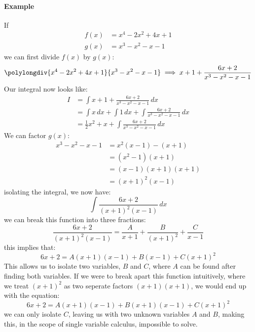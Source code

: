 \documentclass[12pt]{article}
\begin{document}
\paragraph{Example} If 
\begin{align*}
    f(x) &= x^4-2x^2+4x+1 \\
    g(x) &= x^3-x^2-x-1
\end{align*}
we can first divide $f(x)$ by $g(x)$:
\begin{equation*}
    \polylongdiv{x^4-2x^2+4x+1}{x^3-x^2-x-1}
    \implies x+1+\frac{6x+2}{x^3-x^2-x-1}
\end{equation*}
Our integral now looks like:
\begin{align*}
    I &= \int x+1+\frac{6x+2}{x^3-x^2-x-1} \,dx \\
      &= \int x \,dx + \int 1 \,dx + \int \frac{6x+2}{x^3-x^2-x-1} \,dx \\
      &= \frac{1}{2}x^2 + x + \int \frac{6x+2}{x^3-x^2-x-1} \,dx
\end{align*}
We can factor $g(x)$:
\begin{align*}
    x^3-x^2-x-1 &= x^2(x-1)-(x+1) \\
                &= (x^2-1)(x+1) \\
                &= (x-1)(x+1)(x+1) \\
                &= (x+1)^2(x-1)
\end{align*}
isolating the integral, we now have:
\[ \int \frac{6x+2}{(x+1)^2(x-1)} \,dx \]
we can break this function into three fractions:
\[ \frac{6x+2}{(x+1)^2(x-1)} = \frac{A}{x+1} + \frac{B}{(x+1)^2} + \frac{C}{x-1} \]
this implies that:
\[ 6x+2 = A(x+1)(x-1) + B(x-1) + C(x+1)^2 \]
This allows us to isolate two variables, $B$ and $C$, where $A$ can be found after finding
both variables. If we were to break apart this function intuitively, where we treat $(x+1)^2$
as two seperate factors $(x+1)(x+1)$, we would end up with the equation:
\[ 6x+2 = A(x+1)(x-1) + B(x+1)(x-1) + C(x+1)^2 \]
we can only isolate $C$, leaving us with two unknown variables $A$ and $B$, making this, 
in the scope of single variable calculus, impossible to solve.
\end{document}
